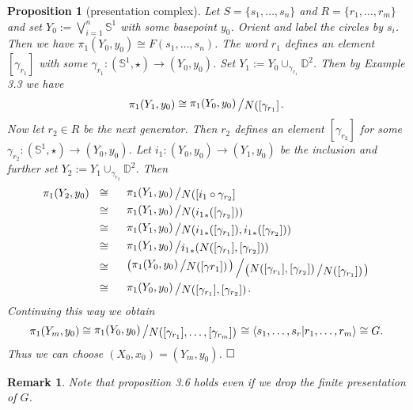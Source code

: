 \documentclass[11pt]{book}
\numberwithin{dummy}{section}
\newtheorem{proposition}[theorem]{Proposition}
\newtheorem{remark}[theorem]{Remark}
\theoremstyle{nonumberbreak}
\newenvironment{pr}[1][]{\ifthenelse{\equal{#1}{}}{\proof}{\proof[#1]}\rm}{\endproof}
\newcommand{\la}{\longrightarrow}
\newcommand{\slant}[2]{{\raisebox{.1em}{$#1$}\left/\raisebox{-.1em}{$#2$}\right.}}
\newcommand{\bigslant}[2]{{\raisebox{.2em}{$#1$}\left/\raisebox{-.2em}{$#2$}\right.}}
\begin{document}
\begin{spacing}{1.4}
\begin{proposition}[presentation complex]
\begin{pr}
Let $S= \{s_1, \ldots, s_n\}$ and $R= \{r_1, \ldots, r_m\}$ and set $Y_0 := \bigvee _{i=1}^n \mathbb{S}^1$ with some basepoint $y_0$. Orient and label the circles by $s_i$. Then we have $\pi_1(Y_0, y_0) \cong F(s_1, \ldots, s_n)$. The word $r_1$ defines an element $[\gamma_{r_1}]$ with some $\gamma_{r_1}: (\mathbb{S}^1, \star) \la (Y_0, y_0)$. Set $Y_1 := Y_0 \cup_{\gamma_{r_1}} \mathbb{D}^2$. Then by Example 3.3 we have 
$$\pi_1(Y_1, y_0) \cong \slant{\pi_1(Y_0, y_0)}{N([\gamma_{r_1}]}.$$
Now let $r_2 \in R$ be the next generator. Then $r_2$ defines an element $[\gamma_{r_2}]$ for some $\gamma_{r_2}: (\mathbb{S}^1, \star) \la (Y_0, y_0)$. Let $i_1: (Y_0,y_0) \la (Y_1, y_0)$ be the inclusion and further set $Y_2:= Y_1 \cup_{\gamma_{r_2}} \mathbb{D}^2$. Then 
\setlength{\abovedisplayskip}{5.5pt}
\setlength{\belowdisplayskip}{5.5pt}
\begin{alignat*}{5}
\pi_1(Y_2, y_0) \ \ &\cong&& \ \  \slant{\pi_1(Y_1, y_0)}{N([i_1 \circ \gamma_{r_2}]} \\
&\cong&& \ \ \slant{\pi_1(Y_1, y_0)}{N({i_1}_*([\gamma_{r_2}]))} \\
&\cong&& \ \ \slant{\pi_1(Y_1, y_0)}{N({i_1}_*([\gamma_{r_1}]), {i_1}_*([\gamma_{r_2}]))} \\
&\cong&& \ \ \slant{\pi_1(Y_1,y_0)}{{i_1}_*(N([\gamma_{r_1}], [\gamma_{r_2}]))} \\
&\cong && \ \ \bigslant{  \left( \slant{ \pi_1(Y_0, y_0)}{N([\gamma{r_1}])} \right)}{\left( \slant{N([\gamma_{r_1}], [\gamma_{r_2}])}{N([\gamma_{r_1}])} \right)} \\
&\cong&& \ \ \slant{\pi_1(Y_0,y_0)}{N([\gamma_{r_1}], [\gamma_{r_2}])}.\\
\end{alignat*}
Continuing this way we obtain
$$\pi_1(Y_m,y_0) \cong \slant{\pi_1(Y_0, y_0)}{N([\gamma_{r_1}], \ldots, [\gamma_{r_m}])} \cong \langle s_1, \ldots, s_r \vert r_1, \ldots, r_m \rangle  \cong G.$$
Thus we can choose $(X_0, x_0) = (Y_m, y_0)$. $\hfill \Box$

\end{pr}


\end{proposition}

\begin{remark}
Note that proposition 3.6 holds even if we drop the finite presentation of $G$.
\end{remark}










\end{spacing}
\end{document}
